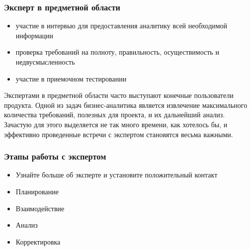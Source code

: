 \documentclass{../industrial-development}
\begin{document}
\begin{frame} \frametitle{Эксперт в предметной области}
	\begin{itemize}
		\item участие в интервью для предоставления аналитику всей необходимой информации
		\item проверка требований на полноту, правильность, осуществимость и недвусмысленность
		\item участие в приемочном тестировании
	\end{itemize}
\end{frame}

\lecturenotes
Экспертами в предметной области часто выступают конечные пользователи продукта.
Одной из задач бизнес-аналитика является извлечение максимального количества требований, полезных для проекта, и их дальнейший анализ. Зачастую для этого выделяется не так много времени, как хотелось бы, и эффективно проведенные встречи с экспертом становятся весьма важными.

\begin{frame} \frametitle{Этапы работы с экспертом}
	\begin{itemize}
		\item Узнайте больше об эксперте и установите положительный контакт
		\item Планирование
		\item Взаимодействие
		\item Анализ
		\item Корректировка
	\end{itemize}
\end{frame}
\end{document}
